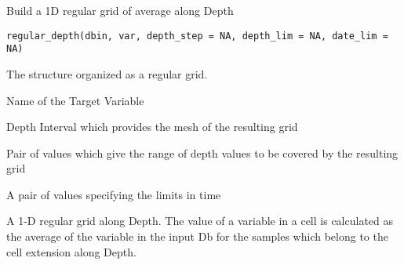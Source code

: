 %
\begin{Description}\relax
Build a 1D regular grid of average along Depth
\end{Description}
%
\begin{Usage}
\begin{verbatim}
regular_depth(dbin, var, depth_step = NA, depth_lim = NA, date_lim = NA)
\end{verbatim}
\end{Usage}
%
\begin{Arguments}
\begin{ldescription}
\item[\code{dbin}] 
The  structure organized as a regular grid.

\item[\code{var}] 
Name of the Target Variable

\item[\code{depth\_step}] 
Depth Interval which provides the mesh of the resulting grid

\item[\code{depth\_lim}] 
Pair of values which give the range of depth values to be covered by
the resulting grid

\item[\code{date\_lim}] 
A pair of values specifying the limits in time

\end{ldescription}
\end{Arguments}
%
\begin{Value}
A 1-D regular grid along Depth. The value of a variable in a cell is calculated
as the average of the variable in the input Db for the samples which belong to
the cell extension along Depth.
\end{Value}
